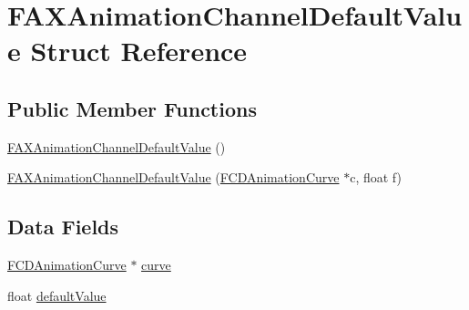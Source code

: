 \hypertarget{structFAXAnimationChannelDefaultValue}{
\section{FAXAnimationChannelDefaultValue Struct Reference}
\label{structFAXAnimationChannelDefaultValue}
}
\subsection*{Public Member Functions}
\begin{DoxyCompactItemize}
\item 
\hyperlink{structFAXAnimationChannelDefaultValue_acdfc806047c445a38b3db8014cf9fb33}{FAXAnimationChannelDefaultValue} ()
\item 
\hyperlink{structFAXAnimationChannelDefaultValue_ab75ce7cbfa439e6c8b38e3a9d4cacf27}{FAXAnimationChannelDefaultValue} (\hyperlink{classFCDAnimationCurve}{FCDAnimationCurve} $\ast$c, float f)
\end{DoxyCompactItemize}
\subsection*{Data Fields}
\begin{DoxyCompactItemize}
\item 
\hyperlink{classFCDAnimationCurve}{FCDAnimationCurve} $\ast$ \hyperlink{structFAXAnimationChannelDefaultValue_aa2acbd5661a378862458fd0e392c8dec}{curve}
\item 
float \hyperlink{structFAXAnimationChannelDefaultValue_a03faf32f6146a54daa1902baf93edde4}{defaultValue}
\end{DoxyCompactItemize}


